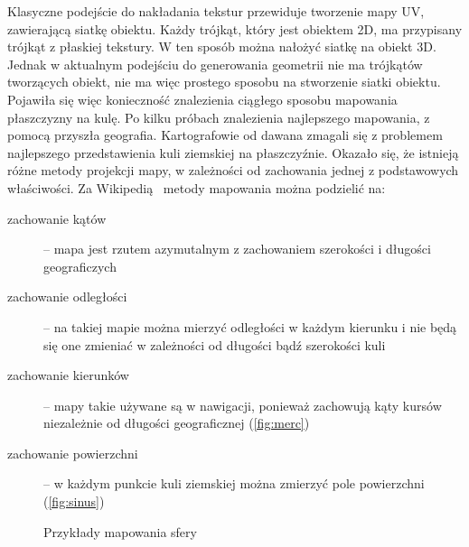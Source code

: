 Klasyczne podejście do nakładania tekstur przewiduje tworzenie mapy UV, zawierającą siatkę obiektu. Każdy trójkąt, który jest obiektem 2D, ma przypisany trójkąt z płaskiej tekstury. W ten sposób można nałożyć siatkę na obiekt 3D. Jednak w aktualnym podejściu do generowania geometrii nie ma trójkątów tworzących obiekt, nie ma więc prostego sposobu na stworzenie siatki obiektu. Pojawiła się więc konieczność znalezienia ciągłego sposobu mapowania płaszczyzny na kulę. Po kilku próbach znalezienia najlepszego mapowania, z pomocą przyszła geografia. Kartografowie od dawana zmagali się z problemem najlepszego przedstawienia kuli ziemskiej na płaszczyźnie. Okazało się, że istnieją różne metody projekcji mapy, w zależności od zachowania jednej z podstawowych właściwości. Za Wikipedią~\cite{wiki:mapproj} metody mapowania można podzielić na:
\begin{description}
\item[zachowanie kątów] -- mapa jest rzutem azymutalnym z zachowaniem szerokości i długości geograficzych
\item[zachowanie odległości] -- na takiej mapie można mierzyć odległości w każdym kierunku i nie będą się one zmieniać w zależności od długości bądź szerokości kuli
\item[zachowanie kierunków] -- mapy takie używane są w nawigacji, ponieważ zachowują kąty kursów niezależnie od długości geograficznej (\hyperref[fig:merc]{\ref{fig:merc}})
\item[zachowanie powierzchni] -- w każdym punkcie kuli ziemskiej można zmierzyć pole powierzchni (\hyperref[fig:sinus]{\ref{fig:sinus}})
\end{description}

\begin{figure}
\centering
	 \hspace{.0\textwidth}
\caption{Przykłady mapowania sfery}
\label{fig:project}
\end{figure}

